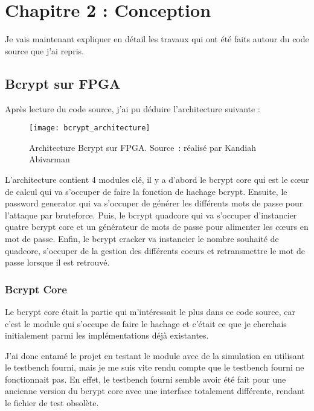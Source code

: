\chapter{Chapitre 2 : Conception}

Je vais maintenant expliquer en détail les travaux qui ont été faits autour du code source que j'ai repris.

\section{Bcrypt sur FPGA}

Après lecture du code source, j'ai pu déduire l'architecture suivante :

\begin{figure}[tbph!]
	\centering
	\texttt{[image: bcrypt\_architecture]}
	\caption[Architecture Bcrypt sur FPGA]{Architecture Bcrypt sur FPGA. Source : réalisé par Kandiah Abivarman}
	\label{fig:bcrypt_architecture}
\end{figure}

L'architecture contient 4 modules clé, il y a d'abord le bcrypt core qui est le cœur de calcul qui va s'occuper de faire la fonction de hachage bcrypt. 
Ensuite, le password generator qui va s'occuper de générer les différents mots de passe pour l'attaque par bruteforce. 
Puis, le bcrypt quadcore qui va s'occuper d'instancier quatre bcrypt core et un générateur de mots de passe pour alimenter les cœurs en mot de passe. 
Enfin, le bcrypt cracker va instancier le nombre souhaité de quadcore, s'occuper de la gestion des différents coeurs et retransmettre le mot de passe lorsque il est retrouvé.

\subsection{Bcrypt Core}

Le bcrypt core était la partie qui m'intéressait le plus dans ce code source, car c'est le module qui s'occupe de faire le hachage et c'était ce que je cherchais initialement parmi les implémentations déjà existantes.

J'ai donc entamé le projet en testant le module avec de la simulation en utilisant le testbench fourni, mais je me suis vite rendu compte que le testbench fourni ne fonctionnait pas. 
En effet, le testbench fourni semble avoir été fait pour une ancienne version du bcrypt core avec une interface totalement différente, rendant le fichier de test obsolète.

